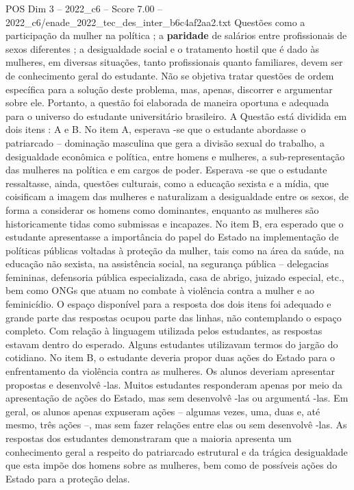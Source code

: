 \begin{textsample}{POS Dim 3 – 2022\_c6 – Score 7.00 – 2022\_c6/enade\_2022\_tec\_des\_inter\_b6c4af2aa2.txt}
Questões como a participação da mulher na política ; a \textbf{paridade} de salários entre profissionais de sexos diferentes ; a desigualdade social e o tratamento hostil que é dado às mulheres, em diversas situações, tanto profissionais quanto familiares, devem ser de conhecimento geral do estudante.
Não se objetiva tratar questões de ordem específica para a solução deste problema, mas, apenas, discorrer e argumentar sobre ele.
Portanto, a questão foi elaborada de maneira oportuna e adequada para o universo do estudante universitário brasileiro.
A Questão está dividida em dois itens : A e B.
No item A, esperava -se que o estudante abordasse o patriarcado – dominação masculina que gera a divisão sexual do trabalho, a desigualdade econômica e política, entre homens e mulheres, a sub-representação das mulheres na política e em cargos de poder.
Esperava -se que o estudante ressaltasse, ainda, questões culturais, como a educação sexista e a mídia, que coisificam a imagem das mulheres e naturalizam a desigualdade entre os sexos, de forma a considerar os homens como dominantes, enquanto as mulheres são historicamente tidas como submissas e incapazes.
No item B, era esperado que o estudante apresentasse a importância do papel do Estado na implementação de políticas públicas voltadas à proteção da mulher, tais como na área da saúde, na educação não sexista, na assistência social, na segurança pública – delegacias femininas, defensoria pública especializada, casa de abrigo, juizado especial, etc., bem como ONGs que atuam no combate à violência contra a mulher e ao feminicídio.
O espaço disponível para a resposta dos dois itens foi adequado e grande parte das respostas ocupou parte das linhas, não contemplando o espaço completo.
Com relação à linguagem utilizada pelos estudantes, as respostas estavam dentro do esperado.
Alguns estudantes utilizavam termos do jargão do cotidiano.
No item B, o estudante deveria propor duas ações do Estado para o enfrentamento da violência contra as mulheres.
Os alunos deveriam apresentar propostas e desenvolvê -las.
Muitos estudantes responderam apenas por meio da apresentação de ações do Estado, mas sem desenvolvê -las ou argumentá -las.
Em geral, os alunos apenas expuseram ações – algumas vezes, uma, duas e, até mesmo, três ações –, mas sem fazer relações entre elas ou sem desenvolvê -las.
As respostas dos estudantes demonstraram que a maioria apresenta um conhecimento geral a respeito do patriarcado estrutural e da trágica desigualdade que esta impõe dos homens sobre as mulheres, bem como de possíveis ações do Estado para a proteção delas.

\end{textsample}
